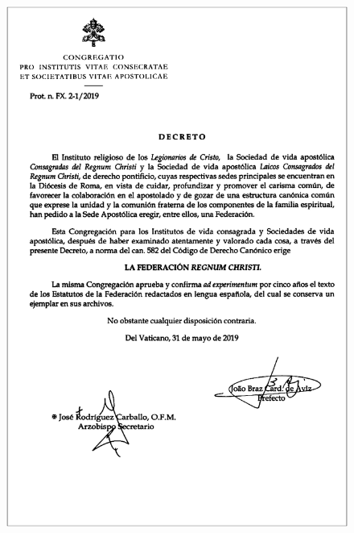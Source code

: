 \begin{figure}
\begin{center}
\includegraphics[height=\textheight]{dekret-powolanie-federacji-rc}
\end{center}
\end{figure}






